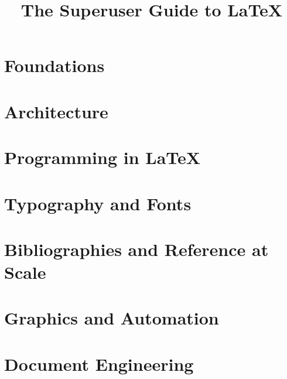\documentclass{superuserguide}
\title{The Superuser Guide to LaTeX}
\begin{document}


\frontmatter
\makebooktitle

\tableofcontents

\mainmatter

\part{Foundations}



\part{Architecture}




\part{Programming in LaTeX}




\part{Typography and Fonts}




\part{Bibliographies and Reference at Scale}



\part{Graphics and Automation}



\part{Document Engineering}




\end{document}
